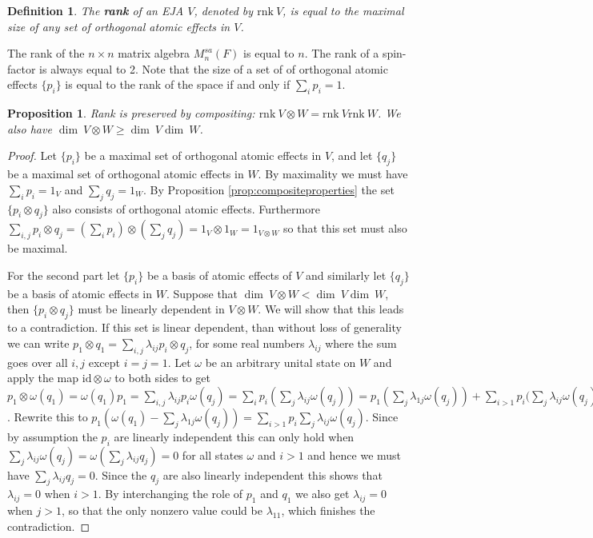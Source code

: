 \documentclass[a4paper,onecolumn,10pt,accepted=2019-05-03, issue=1, volume=1, shorttitle=papers/compositionality-1-1]{compositionalityarticle}
\newcounter{counter}
\numberwithin{counter}{section}
\newtheorem{proposition}[counter]{Proposition}
\newtheorem{definition}[counter]{Definition}
\newcommand{\rnk}{\text{rnk}\xspace}
\newcommand{\id}{\text{id}}
\begin{document}
\begin{definition}
    The \textbf{rank} of an EJA $V$, denoted by $\rnk~V$, is equal to the maximal size of any set of orthogonal atomic effects in $V$.
\end{definition}
\noindent The rank of the $n\times n$ matrix algebra $M_n^{sa}(F)$ is equal to $n$. The rank of a spin-factor is always equal to 2. Note that the size of a set of of orthogonal atomic effects $\{p_i\}$ is equal to the rank of the space if and only if $\sum_i p_i = 1$.

\begin{proposition}\label{prop:rankcomposite}
    Rank is preserved by compositing: $\rnk~V\otimes W = \rnk~V \rnk~W$. We also have $\dim~V\otimes W \geq \dim~V \dim~W$.
\end{proposition}
\begin{proof}
    Let $\{p_i\}$ be a maximal set of orthogonal atomic effects in $V$, and let $\{q_j\}$ be a maximal set of orthogonal atomic effects in $W$. By maximality we must have $\sum_i p_i = 1_V$ and $\sum_j q_j = 1_W$. By Proposition \ref{prop:compositeproperties} the set $\{p_i\otimes q_j\}$ also consists of orthogonal atomic effects. Furthermore $\sum_{i,j} p_i\otimes q_j = (\sum_i p_i)\otimes (\sum_j q_j) = 1_V\otimes 1_W = 1_{V\otimes W}$ so that this set must also be maximal.

    For the second part let $\{p_i\}$ be a basis of atomic effects of $V$ and similarly let $\{q_j\}$ be a basis of atomic effects in $W$. Suppose that $\dim~V\otimes W < \dim~V \dim~W$, then $\{p_i \otimes q_j\}$ must be linearly dependent in $V\otimes W$. We will show that this leads to a contradiction.
    If this set is linear dependent, than without loss of generality we can write $p_1\otimes q_1 = \sum_{i,j} \lambda_{ij} p_i\otimes q_j$, for some real numbers $\lambda_{ij}$ where the sum goes over all $i,j$ except $i=j=1$. 
    Let $\omega$ be an arbitrary unital state on $W$ and apply the map $\id\otimes \omega$ to both sides to get $p_1\otimes \omega(q_1) = \omega(q_1) p_1 = \sum_{i,j} \lambda_{ij} p_i \omega(q_j) = \sum_i p_i (\sum_j \lambda_{ij}\omega(q_j)) = p_1(\sum_j \lambda_{1j} \omega(q_j)) + \sum_{i>1} p_i (\sum_j \lambda_{ij}\omega(q_j)$.
    Rewrite this to $p_1(\omega(q_1)-\sum_j \lambda_{1j} \omega(q_j)) = \sum_{i>1} p_i \sum_j \lambda_{ij}\omega(q_j)$. Since by assumption the $p_i$ are linearly independent this can only hold when $\sum_j \lambda_{ij} \omega(q_j) = \omega(\sum_j \lambda_{ij} q_j) =  0$ for all states $\omega$ and $i>1$ and hence we must have $\sum_j \lambda_{ij} q_j = 0$. Since the $q_j$ are also linearly independent this shows that $\lambda_{ij} = 0$ when $i>1$. By interchanging the role of $p_1$ and $q_1$ we also get $\lambda_{ij} = 0$ when $j>1$, so that the only nonzero value could be $\lambda_{11}$, which finishes the contradiction.
\end{proof}
\end{document}
